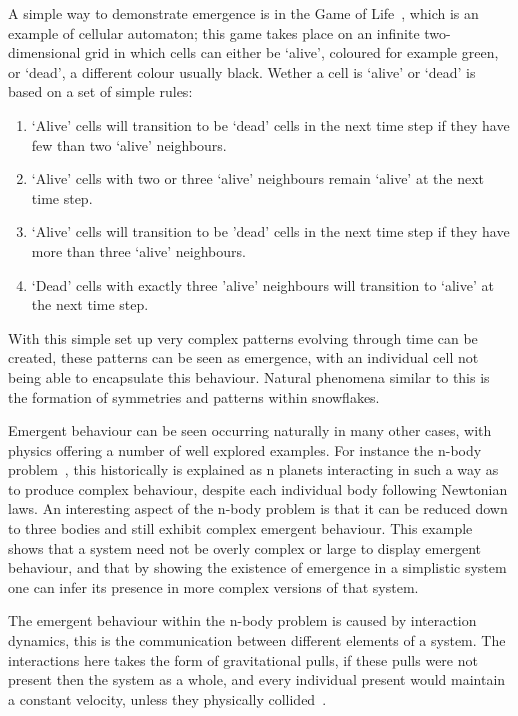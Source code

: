 \documentclass{article}
\begin{document}
A simple way to demonstrate emergence is in the Game of Life~\cite{gameoflifepage}, which is an example of cellular automaton; this game takes place on an infinite two-dimensional grid in which cells can either be `alive', coloured for example green, or `dead', a different colour usually black. Wether a cell is `alive' or `dead' is based on a set of simple rules:   
\begin{enumerate}
  \item `Alive' cells will transition to be `dead' cells in the next time step if they have few than two `alive' neighbours.
  \item `Alive' cells with two or three `alive' neighbours remain `alive' at the next time step.
  \item `Alive' cells will transition to be 'dead' cells in the next time step if they have more than three `alive' neighbours.
  \item `Dead' cells with exactly three 'alive' neighbours will transition to `alive' at the next time step.
\end{enumerate}
With this simple set up very complex patterns evolving through time can be created, these patterns can be seen as emergence, with an individual cell not being able to encapsulate this behaviour. Natural phenomena similar to this is the formation of symmetries and patterns within snowflakes.

Emergent behaviour can be seen occurring naturally in many other cases, with physics offering a number of well explored examples. For instance the n-body problem~\cite{nbodyproblem}, this historically is explained as n planets interacting in such a way as to produce complex behaviour, despite each individual body following Newtonian laws. An interesting aspect of the n-body problem is that it can be reduced down to three bodies and still exhibit complex emergent behaviour. This example shows that a system need not be overly complex or large to display emergent behaviour, and that by showing the existence of emergence in a simplistic system one can infer its presence in more complex versions of that system.

The emergent behaviour within the n-body problem is caused by interaction dynamics, this is the communication between different elements of a system. The interactions here takes the form of gravitational pulls, if these pulls were not present then the system as a whole, and every individual present would maintain a constant velocity, unless they physically collided~\cite{newtonconstantvelocity}.
\end{document}
